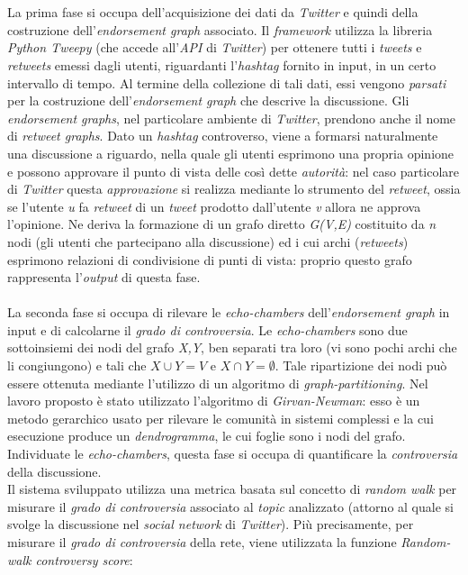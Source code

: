 \\\\La prima fase si occupa dell'acquisizione dei dati da \textit{Twitter} e quindi della costruzione dell'\textit{endorsement graph} associato. Il \textit{framework} utilizza la libreria \textit{Python Tweepy} (che accede all'\textit{API} di \textit{Twitter}) per ottenere tutti i \textit{tweets} e \textit{retweets} emessi dagli utenti, riguardanti l'\textit{hashtag} fornito in input, in un certo intervallo di tempo. Al termine della collezione di tali dati, essi vengono \textit{parsati} per la costruzione dell'\textit{endorsement graph} che descrive la discussione. Gli \textit{endorsement graphs}, nel particolare ambiente di \textit{Twitter}, prendono anche il nome di \textit{retweet graphs}. Dato un \textit{hashtag} controverso, viene a formarsi naturalmente una discussione a riguardo, nella quale gli utenti esprimono una propria opinione e possono approvare il punto di vista delle così dette \textit{autorità}: nel caso particolare di \textit{Twitter} questa \textit{approvazione} si realizza mediante lo strumento del \textit{retweet}, ossia se l'utente \textit{u} fa \textit{retweet} di un \textit{tweet} prodotto dall'utente \textit{v} allora ne approva l'opinione. Ne deriva la formazione di un grafo diretto \textit{G(V,E)} costituito da \textit{n} nodi (gli utenti che partecipano alla discussione) ed i cui archi (\textit{retweets}) esprimono relazioni di condivisione di punti di vista: proprio questo grafo rappresenta l'\textit{output} di questa fase.
\\\\La seconda fase si occupa di rilevare le \textit{echo-chambers} dell'\textit{endorsement graph} in input e di calcolarne il \textit{grado di controversia}. Le \textit{echo-chambers} sono due sottoinsiemi dei nodi del grafo \textit{X,Y}, ben separati tra loro (vi sono pochi archi che li congiungono) e tali che \textit{$X \cup Y = V$} e \textit{$X \cap Y =  \emptyset$}. Tale ripartizione dei nodi può essere ottenuta mediante l'utilizzo di un algoritmo di \textit{graph-partitioning}. Nel lavoro proposto è stato utilizzato l'algoritmo di \textit{Girvan-Newman}: esso è un metodo gerarchico usato per rilevare le comunità in sistemi complessi e la cui esecuzione produce un \textit{dendrogramma}, le cui foglie sono i nodi del grafo. Individuate le \textit{echo-chambers}, questa fase si occupa di quantificare la \textit{controversia} della discussione.
\\Il sistema sviluppato utilizza una metrica basata sul concetto di \textit{random walk} per misurare il \textit{grado di controversia} associato al \textit{topic} analizzato (attorno al quale si svolge la discussione nel \textit{social network} di \textit{Twitter}). Più precisamente, per misurare il \textit{grado di controversia} della rete, viene utilizzata la funzione \textit{Random-walk controversy score}:
